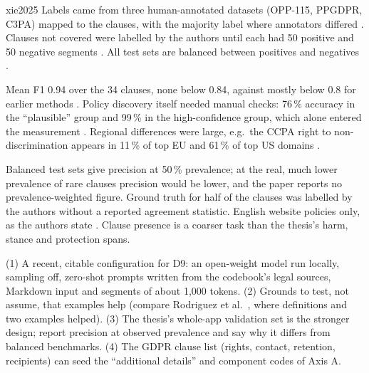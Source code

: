 \begin{papercard}{xie2025}
 Labels came from three human-annotated datasets (OPP-115, PPGDPR, C3PA) mapped to the clauses, with the majority label where annotators differed . Clauses not covered were labelled by the authors until each had 50 positive and 50 negative segments . All test sets are balanced between positives and negatives .

 Mean F1 0.94 over the 34 clauses, none below 0.84, against mostly below 0.8 for earlier methods . Policy discovery itself needed manual checks: 76\,\% accuracy in the ``plausible'' group and 99\,\% in the high-confidence group, which alone entered the measurement . Regional differences were large, e.g.\ the CCPA right to non-discrimination appears in 11\,\% of top EU and 61\,\% of top US domains .

 Balanced test sets give precision at 50\,\% prevalence; at the real, much lower prevalence of rare clauses precision would be lower, and the paper reports no prevalence-weighted figure. Ground truth for half of the clauses was labelled by the authors without a reported agreement statistic. English website policies only, as the authors state . Clause presence is a coarser task than the thesis's harm, stance and protection spans.

 (1) A recent, citable configuration for D9: an open-weight model run locally, sampling off, zero-shot prompts written from the codebook's legal sources, Markdown input and segments of about 1,000 tokens. (2) Grounds to test, not assume, that examples help (compare Rodriguez et al.\ , where definitions and two examples helped). (3) The thesis's whole-app validation set is the stronger design; report precision at observed prevalence and say why it differs from balanced benchmarks. (4) The GDPR clause list (rights, contact, retention, recipients) can seed the ``additional details'' and component codes of Axis A.
\end{papercard}

